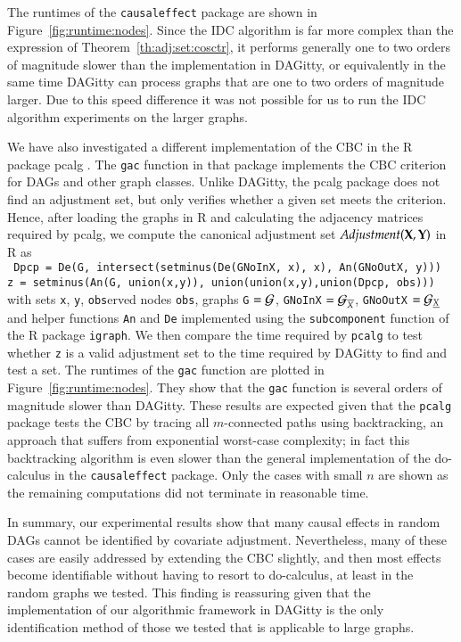 The runtimes  of the  {\tt causaleffect} package are shown in Figure~\ref{fig:runtime:nodes}. Since the IDC algorithm is far more complex than the expression of Theorem~\ref{th:adj:set:cosctr}, it performs generally one to two orders of magnitude slower than the implementation in DAGitty, or equivalently in the same time DAGitty can process graphs that are one to two orders of magnitude  larger.  Due to this speed difference it was not possible for us to run the IDC algorithm experiments on the larger graphs.

We have also investigated a different implementation of the CBC in the R package pcalg \cite{pcalg}. The {\tt gac} function in that package implements the CBC criterion for DAGs and other graph classes. Unlike DAGitty, the pcalg package does not find an adjustment set, but only verifies whether a given set meets the criterion. Hence, after loading the graphs in R and calculating the adjacency matrices required by pcalg, we compute the canonical adjustment set $ \textit{Adjustment}({\bf X},{\bf Y}) $ in R as\\ %
%
{\tt \hspace*{1cm} Dpcp = De(G, intersect(setminus(De(GNoInX, x), x), An(GNoOutX, y)))\\
  \hspace*{1cm} z = setminus(An(G, union(x,y)), union(union(x,y),union(Dpcp, obs)))}\\
with sets {\tt x}, {\tt y}, {\tt obs}erved  nodes {\tt obs}, graphs {\tt G} $ ={\cal G} $, {\tt GNoInX} $ = {\cal G}_{\overline{X}} $, {\tt GNoOutX} $ = {\cal G}_{\underline{X}} $ and helper functions {\tt An} and {\tt De} implemented using the {\tt subcomponent} function of the R package {\tt igraph}. We then compare the time required by {\tt pcalg} to test whether {\tt z} is a valid adjustment set to the time required by DAGitty to find and test a set.
The runtimes of the {\tt gac} function are plotted in Figure~\ref{fig:runtime:nodes}. 
They show that the {\tt gac} function is several orders of magnitude  slower than DAGitty. These results are expected given that the {\tt pcalg} package tests the CBC by tracing all $m$-connected paths using backtracking, an approach that suffers from exponential worst-case complexity; in fact this backtracking algorithm is even slower than the general implementation of the do-calculus in the {\tt causaleffect} package. Only the cases with small $ n $ are shown as the remaining computations did not terminate in reasonable time.

In summary, our experimental results show that many causal effects in random DAGs cannot be identified by covariate adjustment. Nevertheless, many of these cases are easily addressed by extending the CBC slightly, and then most effects become identifiable without having to resort to do-calculus, at least in the random graphs we tested. This finding is reassuring given that the implementation of our algorithmic framework in DAGitty is the only identification method of those we tested that is applicable to large graphs.

